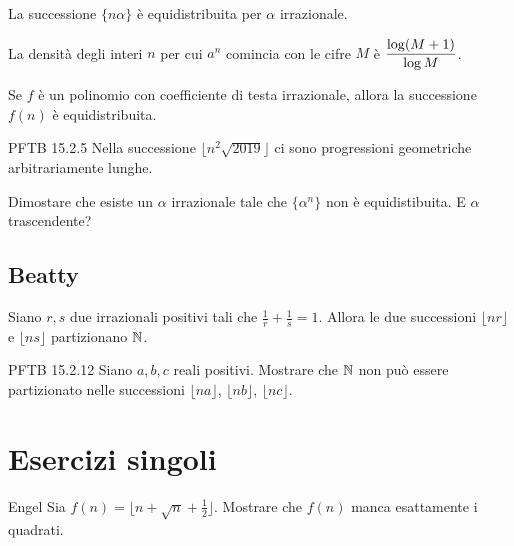 \documentclass[12pt]{article}
\begin{document}
\begin{corollary}
    La successione $\{ n\alpha \}$ è equidistribuita per $\alpha$ irrazionale.
\end{corollary}

\begin{corollary}
    La densità degli interi $n$ per cui $a^n$ comincia con le cifre $M$ è $\displaystyle\frac{\log(M+1)}{\log M}$.
\end{corollary}

\begin{theorem}
    Se $f$ è un polinomio con coefficiente di testa irrazionale, allora la successione $f(n)$ è equidistribuita.
\end{theorem}

\begin{esercizio}{PFTB 15.2.5}{}
    Nella successione $\lfloor n^2\sqrt{2019} \rfloor$ ci sono progressioni geometriche arbitrariamente lunghe.
\end{esercizio}

\begin{exercise}
    Dimostare che esiste un $\alpha$ irrazionale tale che $\{ \alpha^n \}$ non è equidistibuita. E $\alpha$ trascendente?
\end{exercise}

\subsection{Beatty}
\begin{theorem}
    Siano $r,s$ due irrazionali positivi tali che $\frac1r+\frac1s=1$. Allora le due successioni $\lfloor nr\rfloor$ e $\lfloor ns \rfloor$ partizionano $\mathbb{N}$.
\end{theorem}

\begin{esercizio}{PFTB 15.2.12}{}
    Siano $a,b,c$ reali positivi. Mostrare che $\mathbb{N}$ non può essere partizionato nelle successioni $\lfloor na\rfloor$, $\lfloor nb\rfloor$, $\lfloor nc\rfloor$.
\end{esercizio}





\newpage

\section{Esercizi singoli}

\begin{esercizio}{Engel}{}
    Sia $f(n)=\lfloor n+\sqrt n+\frac12 \rfloor$. Mostrare che $f(n)$ manca esattamente i quadrati.
\end{esercizio}
\end{document}
